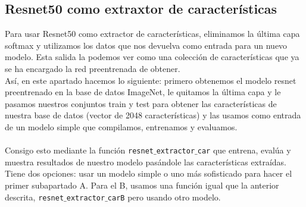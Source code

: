 \documentclass[12pt]{article}
\begin{document}
\subsection*{Resnet50 como extraxtor de características}
Para usar Resnet50 como extractor de características, eliminamos la última capa softmax y utilizamos los datos que nos devuelva como entrada para un nuevo modelo. Esta salida la podemos ver como una colección de características que ya se ha encargado la red preentrenada de obtener.\\
Así, en este apartado hacemos lo siguiente: primero obtenemos el modelo resnet preentrenado en la base de datos ImageNet, le quitamos la última capa y le pasamos nuestros conjuntos train y test para obtener las características de nuestra base de datos (vector de 2048 características) y las usamos como entrada de un modelo simple que compilamos, entrenamos y evaluamos.\\\\
Consigo esto mediante la función \texttt{resnet$\_$extractor$\_$car} que entrena, evalúa y muestra resultados de nuestro modelo pasándole las características extraídas. Tiene dos opciones: usar un modelo simple o uno más sofisticado para hacer el primer subapartado A. Para el B, usamos una función igual que la anterior descrita, \texttt{resnet$\_$extractor$\_$carB} pero usando otro modelo.
\end{document}
